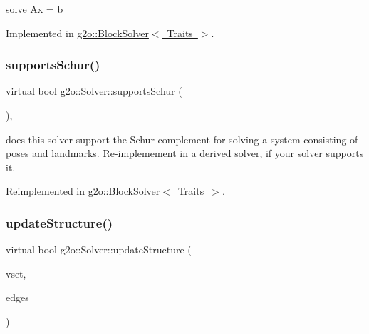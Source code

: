 solve Ax = b 

Implemented in \mbox{\hyperlink{classg2o_1_1_block_solver_a589a75a131cce100c1945ad2786214d7}{g2o\+::\+Block\+Solver$<$ Traits $>$}}.

\mbox{\label{classg2o_1_1_solver_a36c68f7bc0b8864ee7722bc3c06de554}} 
\subsubsection{\texorpdfstring{supports\+Schur()}{supportsSchur()}}
{\footnotesize\ttfamily virtual bool g2o\+::\+Solver\+::supports\+Schur (\begin{DoxyParamCaption}{ }\end{DoxyParamCaption})\hspace{0.3cm}{\ttfamily [inline]}, {\ttfamily [virtual]}}

does this solver support the Schur complement for solving a system consisting of poses and landmarks. Re-\/implemement in a derived solver, if your solver supports it. 

Reimplemented in \mbox{\hyperlink{classg2o_1_1_block_solver_a68dc822ce48e80ceacce69c7bd029674}{g2o\+::\+Block\+Solver$<$ Traits $>$}}.

\mbox{\label{classg2o_1_1_solver_aeca71878e37081b6138f90ac60ec1f89}} 
\subsubsection{\texorpdfstring{update\+Structure()}{updateStructure()}}
{\footnotesize\ttfamily virtual bool g2o\+::\+Solver\+::update\+Structure (\begin{DoxyParamCaption}\item[{const std\+::vector$<$ \mbox{\hyperlink{classg2o_1_1_hyper_graph_1_1_vertex}{Hyper\+Graph\+::\+Vertex}} $\ast$$>$ \&}]{vset,  }\item[{const \mbox{\hyperlink{classg2o_1_1_hyper_graph_a5e2970e236c0dcb4eff7c205d7b6b4ae}{Hyper\+Graph\+::\+Edge\+Set}} \&}]{edges }\end{DoxyParamCaption})\hspace{0.3cm}{\ttfamily [pure virtual]}}

